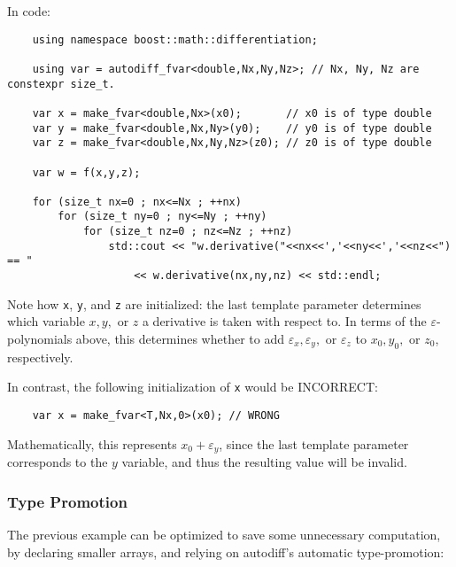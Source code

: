 \documentclass{article}
\begin{document}
In code:
\begin{verbatim}
    using namespace boost::math::differentiation;

    using var = autodiff_fvar<double,Nx,Ny,Nz>; // Nx, Ny, Nz are constexpr size_t.

    var x = make_fvar<double,Nx>(x0);       // x0 is of type double
    var y = make_fvar<double,Nx,Ny>(y0);    // y0 is of type double
    var z = make_fvar<double,Nx,Ny,Nz>(z0); // z0 is of type double

    var w = f(x,y,z);

    for (size_t nx=0 ; nx<=Nx ; ++nx)
        for (size_t ny=0 ; ny<=Ny ; ++ny)
            for (size_t nz=0 ; nz<=Nz ; ++nz)
                std::cout << "w.derivative("<<nx<<','<<ny<<','<<nz<<") == "
                    << w.derivative(nx,ny,nz) << std::endl;
\end{verbatim}
Note how {\tt x}, {\tt y}, and {\tt z} are initialized: the last template parameter determines which variable
$x, y,$ or $z$ a derivative is taken with respect to. In terms of the $\varepsilon$-polynomials
above, this determines whether to add $\varepsilon_x, \varepsilon_y,$ or $\varepsilon_z$ to
$x_0, y_0,$ or $z_0$, respectively.

In contrast, the following initialization of {\tt x} would be INCORRECT:

\begin{verbatim}
    var x = make_fvar<T,Nx,0>(x0); // WRONG
\end{verbatim}
Mathematically, this represents $x_0+\varepsilon_y$, since the last template parameter corresponds to the
$y$ variable, and thus the resulting value will be invalid.

\subsubsection{Type Promotion}

The previous example can be optimized to save some unnecessary computation, by declaring smaller arrays,
and relying on autodiff's automatic type-promotion:
\end{document}
